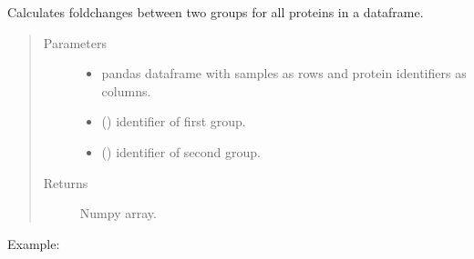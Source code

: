 \documentclass[letterpaper,10pt,english]{sphinxmanual}
\begin{document}

\begin{fulllineitems}
\label{\detokenize{_autosummary/analytics_core.analytics:analytics_core.analytics.analytics.calculate_fold_change}}
Calculates fold\sphinxhyphen{}changes between two groups for all proteins in a dataframe.
\begin{quote}\begin{description}
\item[{Parameters}] \leavevmode\begin{itemize}
\item {} 
 \textendash{} pandas dataframe with samples as rows and protein identifiers as columns.

\item {} 
 () \textendash{} identifier of first group.

\item {} 
 () \textendash{} identifier of second group.

\end{itemize}

\item[{Returns}] \leavevmode
Numpy array.

\end{description}\end{quote}

Example:

\begin{sphinxVerbatim}[commandchars=\\\{\}]
    
\end{sphinxVerbatim}

\end{fulllineitems}
\end{document}
